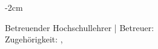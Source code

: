 \begin{titlepage}
\begin{addmargin}[-1cm]{-2cm}
\begin{center}
        

        \vspace{2em}

        Betreuender Hochschullehrer | Betreuer: \mySupervisor\\
        Zugehörigkeit: \myFaculty, \myDepartment %




%
%
%

    \end{center}
  \end{addmargin}
\end{titlepage}
